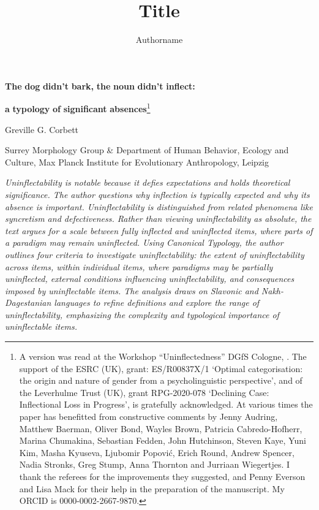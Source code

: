 \documentclass[output=paper]{langscibook}
\author{Authorname\orcid{}\affiliation{}}
\title{Title}
\begin{document}
\maketitle 


\textbf{The} \textbf{dog} \textbf{didn’t} \textbf{bark,} \textbf{the} \textbf{noun} \textbf{didn’t} \textbf{inflect:}

\textbf{a} \textbf{typology} \textbf{of} \textbf{significant} \textbf{absences}\footnote{\textrm{A version was read at the Workshop “Uninflectedness” DGfS Cologne, \citealt{March2023}. The support of the ESRC (UK), grant: ES/R00837X/1 ‘Optimal categorisation: the origin and nature of gender from a psycholinguistic perspective’, and of the Leverhulme Trust (UK), grant RPG-2020-078 ‘Declining Case: Inflectional Loss in Progress’, is gratefully acknowledged. At various times the paper has benefitted from constructive comments by Jenny Audring, Matthew Baerman, Oliver Bond, Wayles Brown, Patricia Cabredo-Hofherr, Marina Chumakina, Sebastian Fedden, John Hutchinson, Steven Kaye, Yuni Kim, Masha Kyuseva, Ljubomir Popović, Erich Round, Andrew Spencer, Nadia Stronks, Greg Stump, Anna Thornton and Jurriaan Wiegertjes. I thank the referees for the improvements they suggested, and Penny Everson and Lisa Mack for their help in the preparation of the manuscript. My ORCID is 0000-0002-2667-9870.}}

Greville G. Corbett

Surrey Morphology Group \& Department of Human Behavior, Ecology and Culture, Max Planck Institute for Evolutionary Anthropology, Leipzig


\textit{Uninflectability is notable because it defies expectations and holds theoretical significance. The author questions why inflection is typically expected and why its absence is important. Uninflectability is distinguished from related phenomena like syncretism and defectiveness. Rather than viewing uninflectability as absolute, the text argues for a scale between fully inflected and uninflected items, where parts of a paradigm may remain uninflected. Using Canonical Typology, the author outlines four criteria to investigate uninflectability:  the extent of uninflectability across items,  within individual items, where paradigms may be partially uninflected,  external conditions influencing uninflectability, and  consequences imposed by uninflectable items. The analysis draws on Slavonic and Nakh-Dagestanian languages to refine definitions and explore the range of uninflectability, emphasizing the complexity and typological importance of uninflectable items.}
\end{document}
